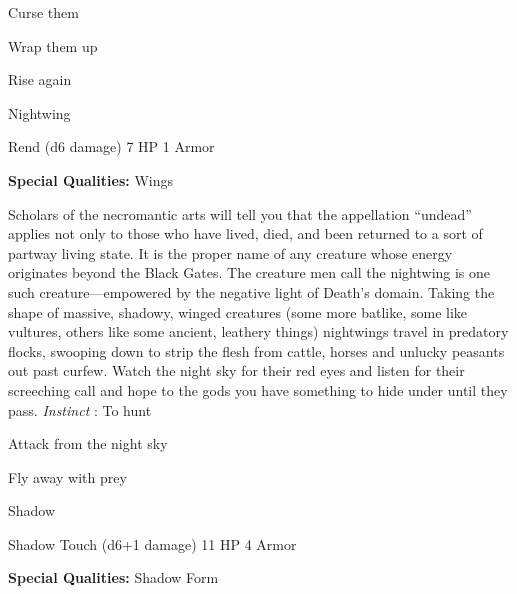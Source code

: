 \startitemize[1,packed]
         
\item Curse them

         
\item Wrap them up

         
\item Rise again

       
\stopitemize
       
\startMonsterName
Nightwing	 
\stopMonsterName
       

Rend (d6 damage)	7 HP	1 Armor

       


       
\startMonsterQualities
         {\bf Special Qualities:}  Wings
\stopMonsterQualities
       
\startMonsterDescription
Scholars of the necromantic arts will tell you that the appellation “undead” applies not only to those who have lived, died, and been returned to a sort of partway living state.  It is the proper name of any creature whose energy originates beyond the Black Gates.  The creature men call the nightwing is one such creature—empowered by the negative light of Death’s domain.  Taking the shape of massive, shadowy, winged creatures (some more batlike, some like vultures, others like some ancient, leathery things) nightwings travel in predatory flocks, swooping down to strip the flesh from cattle, horses and unlucky peasants out past curfew.  Watch the night sky for their red eyes and listen for their screeching call and hope to the gods you have something to hide under until they pass. {\em Instinct} : To hunt
\stopMonsterDescription
       
\startitemize[1,packed]
         
\item Attack from the night sky

         
\item Fly away with prey

       
\stopitemize
       
\startMonsterName
Shadow	 
\stopMonsterName
       

Shadow Touch (d6+1 damage)	11 HP	4 Armor

       


       
\startMonsterQualities
         {\bf Special Qualities:}  Shadow Form
\stopMonsterQualities
       
